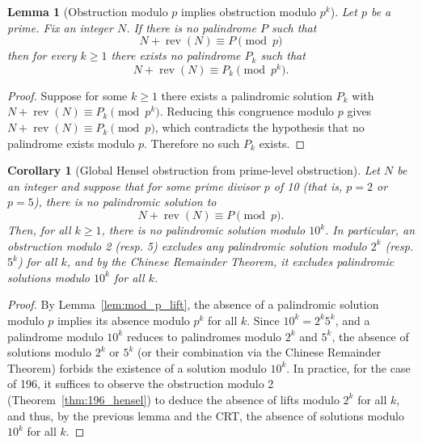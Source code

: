 \documentclass[12pt,a4paper]{article}
\newtheorem{lemma}[theorem]{Lemma}
\newtheorem{corollary}[theorem]{Corollary}
\begin{document}
\begin{lemma}[Obstruction modulo $p$ implies obstruction modulo $p^k$]
Let $p$ be a prime. Fix an integer $N$. If there is no palindrome $P$ such that
$$N+\operatorname{rev}(N)\equiv P\pmod p$$
then for every $k\ge1$ there exists no palindrome $P_k$ such that
$$N+\operatorname{rev}(N)\equiv P_k\pmod{p^k}.$$
\end{lemma}

\begin{proof}
Suppose for some $k\ge1$ there exists a palindromic solution $P_k$ with
$N+\operatorname{rev}(N)\equiv P_k\pmod{p^k}$. Reducing this congruence modulo $p$ gives
$N+\operatorname{rev}(N)\equiv P_k\pmod p$, which contradicts the hypothesis that no palindrome exists modulo $p$. Therefore no such $P_k$ exists.
\end{proof}

\begin{corollary}[Global Hensel obstruction from prime-level obstruction]%
Let $N$ be an integer and suppose that for some prime divisor $p$ of 10 (that is, $p=2$ or $p=5$), there is no palindromic solution to
\[
N + \operatorname{rev}(N) \equiv P \pmod p.
\]
Then, for all $k \ge 1$, there is no palindromic solution modulo $10^k$. In particular, an obstruction modulo 2 (resp. 5) excludes any palindromic solution modulo $2^k$ (resp. $5^k$) for all $k$, and by the Chinese Remainder Theorem, it excludes palindromic solutions modulo $10^k$ for all $k$.
\end{corollary}

\begin{proof}
By Lemma~\ref{lem:mod_p_lift}, the absence of a palindromic solution modulo $p$ implies its absence modulo $p^k$ for all $k$. Since $10^k = 2^k 5^k$, and a palindrome modulo $10^k$ reduces to palindromes modulo $2^k$ and $5^k$, the absence of solutions modulo $2^k$ or $5^k$ (or their combination via the Chinese Remainder Theorem) forbids the existence of a solution modulo $10^k$. In practice, for the case of 196, it suffices to observe the obstruction modulo 2 (Theorem~\ref{thm:196_hensel}) to deduce the absence of lifts modulo $2^k$ for all $k$, and thus, by the previous lemma and the CRT, the absence of solutions modulo $10^k$ for all $k$.
\end{proof}
\end{document}
